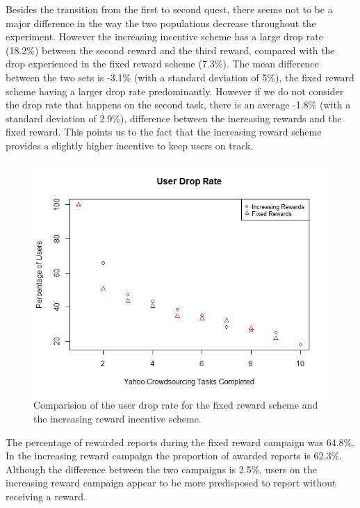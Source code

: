 \documentclass[letterpaper]{article}
\begin{document}
Besides the transition from the first to second quest, there seems not to be a major difference in the way the two populations decrease throughout the experiment. 
However the increasing incentive scheme has a large drop rate (18.2\%) between the second reward and the third reward, compared with the drop experienced in the fixed reward scheme (7.3\%). 
The mean difference between the two sets is -3.1\% (with a standard deviation of 5\%), the fixed reward scheme having a larger drop rate predominantly. However if we do not consider the drop rate that happens on the second task, there is an average -1.8\% (with a standard deviation of 2.9\%), difference between the increasing rewards and the fixed reward. This points us to the fact that the increasing reward scheme provides a slightly higher incentive to keep users on track.



\begin{figure}[htb]
	\begin{center}
		\includegraphics[width=1\linewidth]{images/UserDropRate}
		\caption{Comparision of the user drop rate for the fixed reward scheme and the increasing reward incentive scheme.\label{fig:UserDropRate}}
	\end{center}
\end{figure}

The percentage of rewarded reports during the fixed reward campaign was 64.8\%.
In the increasing reward campaign the proportion of awarded reports is 62.3\%. Although the difference between the two campaigns is 2.5\%, users on the increasing reward campaign appear to be more predisposed to report without receiving a reward.
\end{document}
